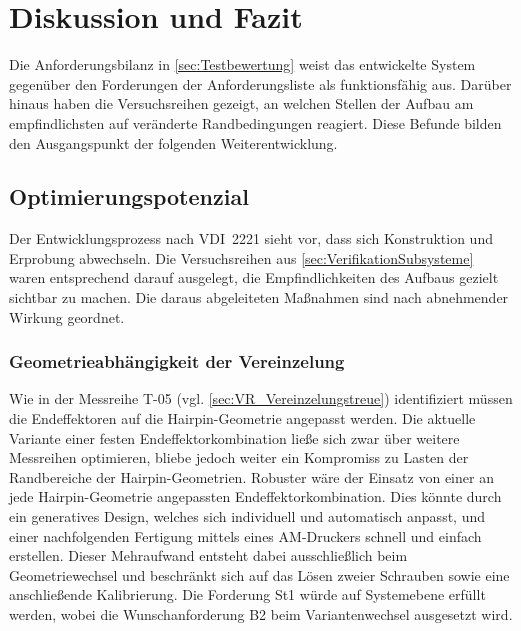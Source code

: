 \section{Diskussion und Fazit}\label{sec:Diskussion}
Die Anforderungsbilanz in \cref{sec:Testbewertung} weist das entwickelte System gegenüber den Forderungen der
Anforderungsliste als funktionsfähig aus. Darüber hinaus haben die Versuchsreihen gezeigt, an welchen Stellen
der Aufbau am empfindlichsten auf veränderte Randbedingungen reagiert. Diese Befunde bilden den Ausgangspunkt
der folgenden Weiterentwicklung.
%
%
\subsection{Optimierungspotenzial}\label{sub:Optimierungspotezial}
Der Entwicklungsprozess nach VDI~2221 sieht vor, dass sich Konstruktion und Erprobung abwechseln. Die
Versuchsreihen aus \cref{sec:VerifikationSubsysteme} waren entsprechend darauf ausgelegt, die Empfindlichkeiten des
Aufbaus gezielt sichtbar zu machen. Die daraus abgeleiteten Maßnahmen sind nach abnehmender Wirkung geordnet.
%
\subsubsection{Geometrieabhängigkeit der Vereinzelung}\label{sub:HF-Vereinzelung}
Wie in der Messreihe T-05 (vgl. \cref{sec:VR_Vereinzelungstreue}) identifiziert müssen die Endeffektoren auf die Hairpin-Geometrie
angepasst werden. Die aktuelle Variante einer festen Endeffektorkombination ließe sich zwar über weitere Messreihen optimieren, 
bliebe jedoch weiter ein Kompromiss zu Lasten der Randbereiche der Hairpin-Geometrien. Robuster wäre der Einsatz von einer
an jede Hairpin-Geometrie angepassten Endeffektorkombination. Dies könnte durch ein generatives Design, welches sich 
individuell und automatisch anpasst, und einer nachfolgenden Fertigung mittels eines AM-Druckers schnell und einfach erstellen.
Dieser Mehraufwand entsteht dabei ausschließlich beim Geometriewechsel und beschränkt sich auf das Lösen zweier Schrauben 
sowie eine anschließende Kalibrierung. Die Forderung St1 würde auf Systemebene erfüllt werden, wobei die Wunschanforderung B2 beim 
Variantenwechsel ausgesetzt wird.

